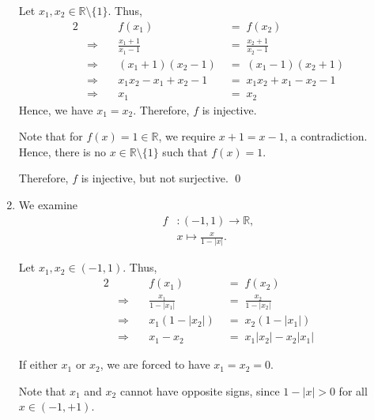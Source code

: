 \documentclass[10pt]{article}
\begin{document}
\begin{enumerate}
                Let $x_1, x_2 \in \mathbb{R}\setminus\{1\}$. Thus,
                \begin{alignat*}{2}
                        &&f(x_1) \;&=\; f(x_2) \\
                        &\Rightarrow\quad& \frac{x_1 + 1}{x_1 - 1}  \;&=\; \frac{x_2 + 1}{x_2 - 1} \\
                        &\Rightarrow\quad& (x_1 + 1)(x_2 - 1)  \;&=\; (x_1 - 1)(x_2 + 1) \tag{$x \neq 1$} \\
                        &\Rightarrow\quad& x_1x_2 - x_1 + x_2  - 1 \;&=\; x_1x_2 + x_1 - x_2 - 1\\ 
                        &\Rightarrow\quad& x_1 \;&=\; x_2
                \end{alignat*}
                Hence, we have $x_1 = x_2$. Therefore, $f$ is injective.

                Note that for $f(x) = 1 \in \mathbb{R}$, we require $x + 1 = x - 1$, a contradiction. Hence, there is no
                $x \in \mathbb{R}\setminus\{1\}$ such that $f(x) = 1$.

                Therefore, $f$ is injective, but not surjective. \qed

                \item We examine
                \begin{align*}
                        f&: (-1, 1) \to \mathbb{R},\\
                        &x \mapsto  \frac{x}{1 - |x|}.
                \end{align*}
                
                Let $x_1, x_2 \in (-1, 1)$. Thus,
                \begin{alignat*}{2}
                        &&f(x_1) \;&=\; f(x_2) \\
                        &\Rightarrow\quad& \frac{x_1}{1 - |x_1|} \;&=\; \frac{x_2}{1 - |x_2|} \\
                        &\Rightarrow\quad& x_1(1 - |x_2|) \;&=\; x_2(1 - |x_1|) \tag{$|x| \neq 1$}\\
                        &\Rightarrow\quad& x_1 - x_2 \;&=\; x_1|x_2| - x_2|x_1|
                \end{alignat*}
                
                If either $x_1$ or $x_2$, we are forced to have $x_1 = x_2 = 0$.
                
                Note that $x_1$ and $x_2$ cannot have opposite signs, since $1 - |x| > 0$ for all $x \in (-1,+1)$.


\end{enumerate}
\end{document}
